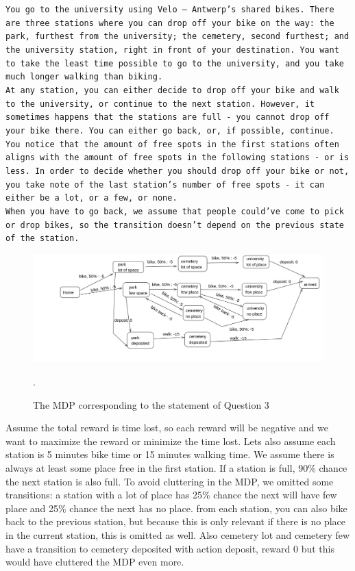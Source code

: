 \documentclass[a4paper]{article}
\begin{document}
\texttt{You go to the university using Velo -- Antwerp's shared bikes. There are three stations where you can drop off your bike on the way: the park, furthest from the university; the cemetery, second furthest; and the university station, right in front of your destination.
You want to take the least time possible to go to the university, and you take much longer walking than biking. \\
At any station, you can either decide to drop off your bike and walk to the university, or continue to the next station.
However, it sometimes happens that the stations are full - you cannot drop off your bike there. You can either go back, or, if possible, continue.\\
You notice that the amount of free spots in the first stations often aligns with the amount of free spots in the following stations - or is less. In order to decide whether you should drop off your bike or not, you take note of the last station's number of free spots - it can either be a lot, or a few, or none.\\
When you have to go back, we assume that people could've come to pick or drop bikes, so the transition doesn't depend on the previous state of the station.
}

\begin{figure}[H]
    \centering
    \includegraphics[width=15cm]{plots/velo_MDP.png}
    \caption{The MDP corresponding to the statement of Question 3}.
    \label{fig:q3}
\end{figure}{}
Assume the total reward is time lost, so each reward will be negative and we want to maximize the reward or minimize the time lost. Lets also assume each station is 5 minutes bike time or 15 minutes walking time. We assume there is always at least some place free in the first station. If a station is full, 90\% chance the next station is also full. To avoid cluttering in the MDP, we omitted some transitions: a station with a lot of place has 25\% chance the next will have few place and 25\% chance the next has no place. from each station, you can also bike back to the previous station, but because this is only relevant if there is no place in the current station, this is omitted as well. Also cemetery lot and cemetery few have a transition to cemetery deposited with action deposit, reward 0 but this would have cluttered the MDP even more.
\end{document}
